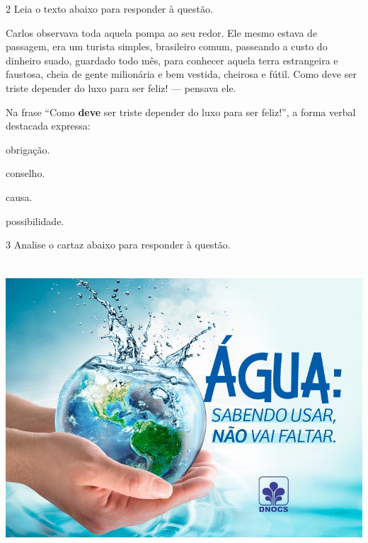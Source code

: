 \num{2} Leia o texto abaixo para responder à questão. 

\begin{myquote}

Carlos observava toda aquela pompa ao seu redor. Ele mesmo estava de passagem,
era um turista simples, brasileiro comum, passeando a custo do dinheiro suado, 
guardado todo mês, para conhecer aquela terra estrangeira e faustosa, cheia de 
gente milionária e bem vestida, cheirosa e fútil. Como deve ser triste depender
do luxo para ser feliz! --- pensava ele.     


\end{myquote}

Na frase ``Como \textbf{deve} ser triste depender do luxo para ser feliz!'', 
a forma verbal destacada expressa:

\begin{escolha}
  
  \item obrigação.
  
  \item conselho.
  
  \item causa.
  
  \item possibilidade.

\end{escolha}

\num{3} Analise o cartaz abaixo para responder à questão.

\includegraphics[width=5.90551in,height=4.29167in]{./imgSAEB_7_POR/media/image13.png}

